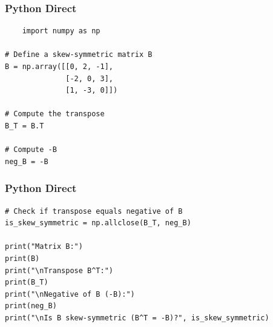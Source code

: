\documentclass{beamer}
\begin{document}
\begin{frame}[fragile]
\frametitle{Python Direct}
\begin{lstlisting}
    import numpy as np

# Define a skew-symmetric matrix B
B = np.array([[0, 2, -1],
              [-2, 0, 3],
              [1, -3, 0]])

# Compute the transpose
B_T = B.T

# Compute -B
neg_B = -B
\end{lstlisting}
\end{frame}
\begin{frame}[fragile]
\frametitle{Python Direct}
\begin{lstlisting}
# Check if transpose equals negative of B
is_skew_symmetric = np.allclose(B_T, neg_B)

print("Matrix B:")
print(B)
print("\nTranspose B^T:")
print(B_T)
print("\nNegative of B (-B):")
print(neg_B)
print("\nIs B skew-symmetric (B^T = -B)?", is_skew_symmetric)
\end{lstlisting}
\end{frame}
\end{document}

